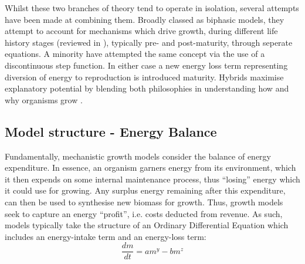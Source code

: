 \documentclass[a4paper]{article} %
\begin{document}
        Whilst these two branches of theory tend to operate in isolation, several attempts have been made at combining them. Broadly classed as biphasic models, they attempt to account for mechanisms which drive growth, during different life history stages (reviewed in \autocite{Wilson2018}), typically pre- and post-maturity, through seperate equations. A minority have attempted the same concept via the use of a discontinuous step function. In either case a new energy loss term representing diversion of energy to reproduction is introduced maturity. Hybrids maximise explanatory potential by blending both philosophies in understanding how and why organisms grow \autocite{Marshall2019b}.

    \subsection{Model structure - Energy Balance}
        Fundamentally, mechanistic growth models consider the balance of energy expenditure. In essence, an organism garners energy from its environment, which it then expends on some internal maintenance process, thus ``losing'' energy which it could use for growing. Any surplus energy remaining after this expenditure, can then be used to synthesise new biomass for growth.  Thus, growth models seek to capture an energy ``profit'', i.e. costs deducted from revenue. As such, models typically take the structure of an Ordinary Differential Equation which includes an energy-intake term and an energy-loss term:
        \begin{equation}
            \frac{dm}{dt} = am^y - bm^z \label{difference_equation}
        \end{equation}        
\end{document}
